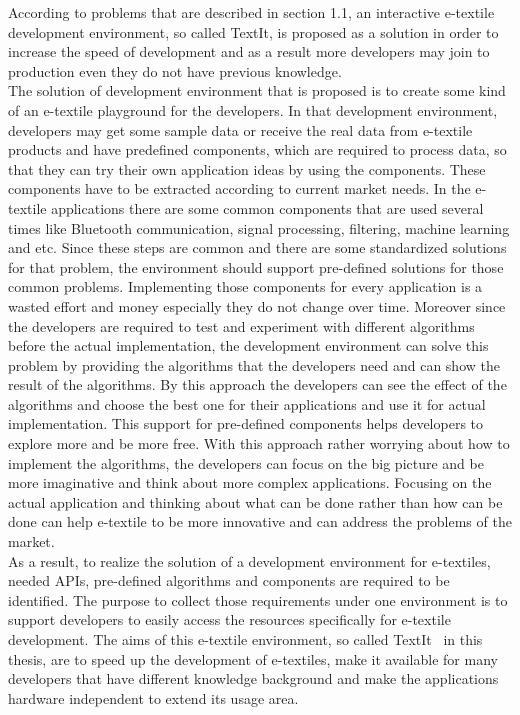 According to problems that are described in section 1.1, an interactive e-textile development environment, so called TextIt, is proposed as a solution in order to increase the speed of development and as a result more developers may join to production even they do not have previous knowledge. \\ 


The solution of development environment that is proposed is to create some kind of an e-textile playground for the developers. In that development environment, developers may get some sample data or receive the real data from e-textile products and have predefined components, which are required to process data, so that they can try their own application ideas by using the components. These components have to be extracted according to current market needs. In the e-textile applications there are some common components that are used several times like Bluetooth communication, signal processing, filtering, machine learning and etc. Since these steps are common and there are some standardized solutions for that problem, the environment should support pre-defined solutions for those common problems. Implementing those components for every application is a wasted effort and money especially they do not change over time. Moreover since the developers are required to test and experiment with different algorithms before the actual implementation, the development environment can solve this problem by providing the algorithms that the developers need and can show the result of the algorithms. By this approach the developers can see the effect of the algorithms and choose the best one for their applications and use it for actual implementation. This support for pre-defined components helps developers to explore more and be more free. With this approach rather worrying about how to implement the algorithms, the developers can focus on the big picture and be more imaginative and think about more complex applications. Focusing on the actual application and thinking about what can be done rather than how can be done can help e-textile to be more innovative and can address the problems of the market. \\

As a result, to realize the solution of a development environment for e-textiles, needed APIs, pre-defined algorithms and components are required to be identified. The purpose to collect those requirements under one environment is to support developers to easily access the resources specifically for e-textile development. The aims of this e-textile environment, so called TextIt \ in this thesis, are to speed up the development of e-textiles, make it available for many developers that have different knowledge background and make the applications hardware independent to extend its usage area.
